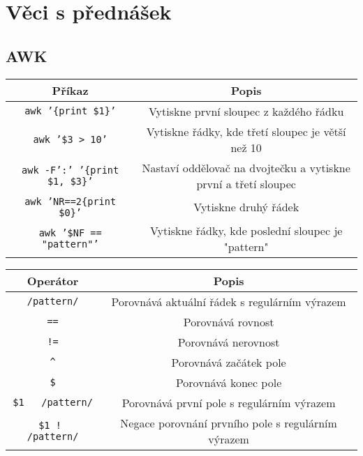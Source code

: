 \documentclass{article}
\begin{document}
\section{Věci s přednášek}
\subsection{AWK}
\begin{center}
\begin{tabular}{|c|c|}
\hline
\textbf{Příkaz} & \textbf{Popis} \\
\hline
\texttt{awk '\{print \$1\}'} & Vytiskne první sloupec z každého řádku \\
\hline
\texttt{awk '\$3 > 10'} & Vytiskne řádky, kde třetí sloupec je větší než 10 \\
\hline
\texttt{awk -F':' '\{print \$1, \$3\}'} & Nastaví oddělovač na dvojtečku a vytiskne první a třetí sloupec \\
\hline
\texttt{awk 'NR==2\{print \$0\}'} & Vytiskne druhý řádek \\
\hline
\texttt{awk '\$NF == "pattern"'} & Vytiskne řádky, kde poslední sloupec je "pattern" \\
\hline
\end{tabular}
\end{center}

\begin{center}
\begin{tabular}{|c|c|}
\hline
\textbf{Operátor} & \textbf{Popis} \\
\hline
\texttt{/pattern/} & Porovnává aktuální řádek s regulárním výrazem \\
\texttt{==} & Porovnává rovnost \\
\hline
\texttt{!=} & Porovnává nerovnost \\
\hline
\texttt{\^} & Porovnává začátek pole \\
\hline
\texttt{\$} & Porovnává konec pole \\
\hline
\texttt{\$1 ~ /pattern/} & Porovnává první pole s regulárním výrazem \\
\hline
\texttt{\$1 !~ /pattern/} & Negace porovnání prvního pole s regulárním výrazem \\
\hline
\end{tabular}
\end{center}
\end{document}
